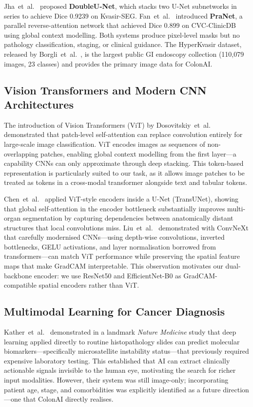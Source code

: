 \documentclass[conference]{IEEEtran}
\begin{document}
Jha~et~al.~\cite{jha2020} proposed \textbf{DoubleU-Net}, which stacks two
U-Net subnetworks in series to achieve Dice 0.9239 on Kvasir-SEG. Fan~et~al.~\cite{fan2020}
introduced \textbf{PraNet}, a parallel reverse-attention network that achieved
Dice 0.899 on CVC-ClinicDB using global context modelling. Both systems produce
pixel-level masks but no pathology classification, staging, or clinical guidance.
The HyperKvasir dataset, released by Borgli~et~al.~\cite{borgli2020}, is the
largest public GI endoscopy collection (110,079 images, 23 classes) and
provides the primary image data for ColonAI.

\subsection{Vision Transformers and Modern CNN Architectures}

The introduction of Vision Transformers (ViT) by Dosovitskiy~et~al.~\cite{dosovitskiy2021}
demonstrated that patch-level self-attention can replace convolution entirely
for large-scale image classification. ViT encodes images as sequences of
non-overlapping patches, enabling global context modelling from the first
layer---a capability CNNs can only approximate through deep stacking.
This token-based representation is particularly suited to our task, as it
allows image patches to be treated as tokens in a cross-modal transformer
alongside text and tabular tokens.

Chen~et~al.~\cite{chen2021} applied ViT-style encoders inside a U-Net
(TransUNet), showing that global self-attention in the encoder bottleneck
substantially improves multi-organ segmentation by capturing dependencies
between anatomically distant structures that local convolutions miss.
Liu~et~al.~\cite{liu2022} demonstrated with ConvNeXt that carefully modernised
CNNs---using depth-wise convolutions, inverted bottlenecks, GELU activations,
and layer normalisation borrowed from transformers---can match ViT performance
while preserving the spatial feature maps that make GradCAM interpretable.
This observation motivates our dual-backbone encoder: we use ResNet50 and
EfficientNet-B0 as GradCAM-compatible spatial encoders rather than ViT.

\subsection{Multimodal Learning for Cancer Diagnosis}

Kather~et~al.~\cite{kather2019} demonstrated in a landmark \textit{Nature
Medicine} study that deep learning applied directly to routine histopathology
slides can predict molecular biomarkers---specifically microsatellite instability
status---that previously required expensive laboratory testing. This established
that AI can extract clinically actionable signals invisible to the human eye,
motivating the search for richer input modalities. However, their system was
still image-only; incorporating patient age, stage, and comorbidities was
explicitly identified as a future direction---one that ColonAI directly realises.
\end{document}
